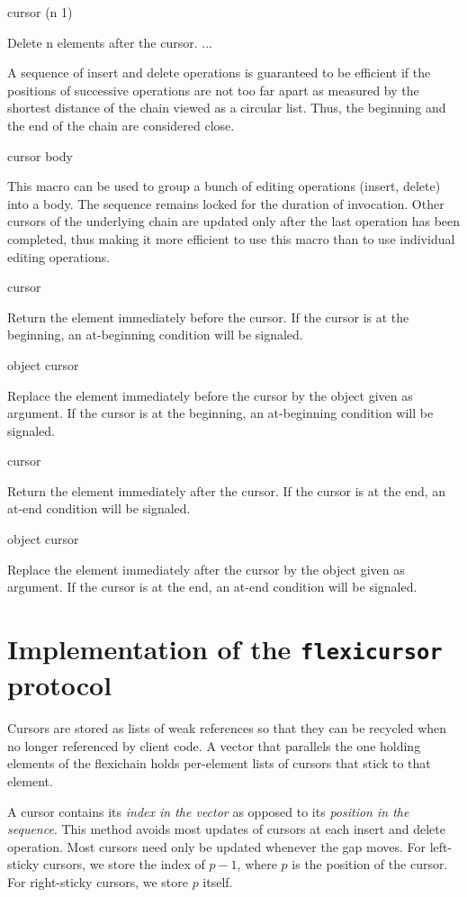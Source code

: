 \documentclass[11pt]{article}
\begin{document}
 {cursor \optional (n 1)}

Delete n elements after the cursor.  ...

A sequence of insert and delete operations is guaranteed to be
efficient if the positions of successive operations are not too far
apart as measured by the shortest distance of the chain viewed as a
circular list.  Thus, the beginning and the end of the chain are
considered close.

 {cursor \body body}

This macro can be used to group a bunch of editing operations (insert,
delete) into a body.  The sequence remains locked for the duration of
invocation.  Other cursors of the underlying chain are updated only
after the last operation has been completed, thus making it more
efficient to use this macro than to use individual editing operations.

 {cursor}

Return the element immediately before the cursor.  If the cursor is
at the beginning, an at-beginning condition will be signaled. 

 {object cursor}

Replace the element immediately before the cursor by the object given
as argument.  If the cursor is at the beginning, an at-beginning
condition will be signaled.

 {cursor}

Return the element immediately after the cursor.  If the cursor is
at the end, an at-end condition will be signaled. 

 {object cursor}

Replace the element immediately after the cursor by the object given
as argument.  If the cursor is at the end, an at-end condition will be
signaled.

\section{Implementation of the \texttt{flexicursor} protocol}

Cursors are stored as lists of weak references so that they can be
recycled when no longer referenced by client code.  A vector that
parallels the one holding elements of the flexichain holds per-element
lists of cursors that stick to that element. 

A cursor contains its \textit{index in the vector} as opposed to its
\textit{position in the sequence}.  This method avoids most updates of
cursors at each insert and delete operation.  Most cursors need only
be updated whenever the gap moves.  For left-sticky cursors, we store
the index of $p-1$, where $p$ is the position of the cursor.  For
right-sticky cursors, we store $p$ itself. 
\end{document}
